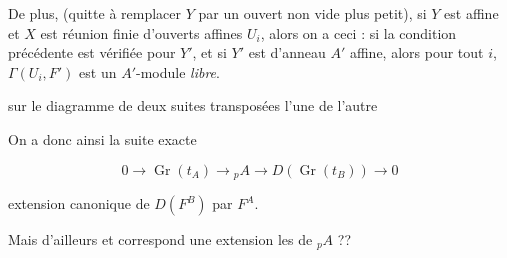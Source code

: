 \documentclass[11pt,a4paper]{article}
\begin{document}
De plus, (quitte à remplacer $Y$ par un ouvert non vide plus petit), si $Y$ est
affine et $X$ est réunion finie d'ouverts affines $U_i$, alors on a ceci : si la
condition précédente est vérifiée pour $Y'$, et si $Y'$ est d'anneau $A'$
affine, alors pour tout $i$, $\Gamma(U_i, F')$ est un $A'$-module \emph{libre}.


\ill{} sur le diagramme de deux suites transposées l'une de l'autre



On a donc ainsi la suite exacte

\[
  0 \longrightarrow \operatorname{Gr}(t_A) \longrightarrow {}_pA
    \longrightarrow D\!\left(\operatorname{Gr}(t_B)\right) \longrightarrow 0
\]

extension canonique de $D(F^B)$ par $F^A$.

Mais d'ailleurs \ill{} \struck{\ill{}} et correspond \ill{} une extension \ill{}
les  de ${}_pA$ ??

\end{document}
